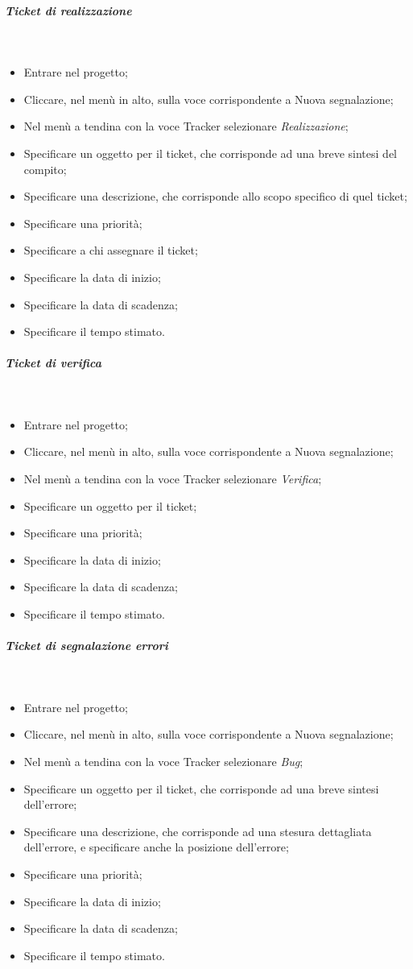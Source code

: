 \subparagraph{Ticket di realizzazione} \hfill \\
\begin{itemize}
\item Entrare nel progetto;
\item Cliccare, nel menù in alto, sulla voce corrispondente a Nuova segnalazione;
\item Nel menù a tendina con la voce Tracker selezionare \textit{Realizzazione};
\item Specificare un oggetto per il ticket, che corrisponde ad una breve sintesi del compito;
\item Specificare una descrizione, che corrisponde allo scopo specifico di quel ticket;
\item Specificare una priorità;
\item Specificare a chi assegnare il ticket;
\item Specificare la data di inizio;
\item Specificare la data di scadenza;
\item Specificare il tempo stimato.
\end{itemize}

\subparagraph{Ticket di verifica} \hfill \\
\label{ticket_verifica}
\begin{itemize}
\item Entrare nel progetto;
\item Cliccare, nel menù in alto, sulla voce corrispondente a Nuova segnalazione;
\item Nel menù a tendina con la voce Tracker selezionare \textit{Verifica};
\item Specificare un oggetto per il ticket;
\item Specificare una priorità;
\item Specificare la data di inizio;
\item Specificare la data di scadenza;
\item Specificare il tempo stimato.
\end{itemize}


\subparagraph{Ticket di segnalazione errori} \hfill \\
\label{ticket_bug}
\begin{itemize}
\item Entrare nel progetto;
\item Cliccare, nel menù in alto, sulla voce corrispondente a Nuova segnalazione;
\item Nel menù a tendina con la voce Tracker selezionare \textit{Bug};
\item Specificare un oggetto per il ticket, che corrisponde ad una breve sintesi dell'errore;
\item Specificare una descrizione, che corrisponde ad una stesura dettagliata dell'errore, e specificare anche la posizione dell'errore;
\item Specificare una priorità;
\item Specificare la data di inizio;
\item Specificare la data di scadenza;
\item Specificare il tempo stimato.
\end{itemize}

